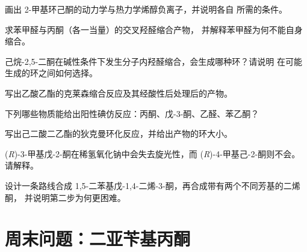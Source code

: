 \begin{exercise}[$\star\star$]\label{exo:b2:enolates-aldol:5}
画出 2-甲基环己酮的动力学与热力学烯醇负离子，并说明各自
所需的条件。
\end{exercise}

\begin{exercise}[$\star\star$]\label{exo:b2:enolates-aldol:6}
求苯甲醛与丙酮（各一当量）的交叉羟醛缩合产物，
并解释苯甲醛为何不能自身缩合。
\end{exercise}

\begin{exercise}[$\star\star$]\label{exo:b2:enolates-aldol:7}
己烷-2,5-二酮在碱性条件下发生分子内羟醛缩合，会生成哪种环？请说明
在可能生成的环之间如何选择。
\end{exercise}

\begin{exercise}[$\star\star$]\label{exo:b2:enolates-aldol:8}
写出乙酸乙酯的克莱森缩合反应及其经酸性后处理后的产物。
\end{exercise}

\begin{exercise}[$\star\star$]\label{exo:b2:enolates-aldol:9}
下列哪些物质能给出阳性碘仿反应：丙酮、戊-3-酮、乙醛、苯乙酮？
\end{exercise}

\begin{exercise}[$\star\star\star$]\label{exo:b2:enolates-aldol:10}
写出己二酸二乙酯的狄克曼环化反应，并给出产物的环大小。
\end{exercise}

\begin{exercise}[$\star\star\star$]\label{exo:b2:enolates-aldol:11}
(\textit{R})-3-甲基戊-2-酮在稀氢氧化钠中会失去旋光性，而
(\textit{R})-4-甲基己-2-酮则不会。请解释。
\end{exercise}

\begin{exercise}[$\star\star\star$]\label{exo:b2:enolates-aldol:12}
设计一条路线合成 1,5-二苯基戊-1,4-二烯-3-酮，再合成带有两个不同芳基的二烯酮，
并说明第二步为何更困难。
\end{exercise}

\section{周末问题：二亚苄基丙酮}

